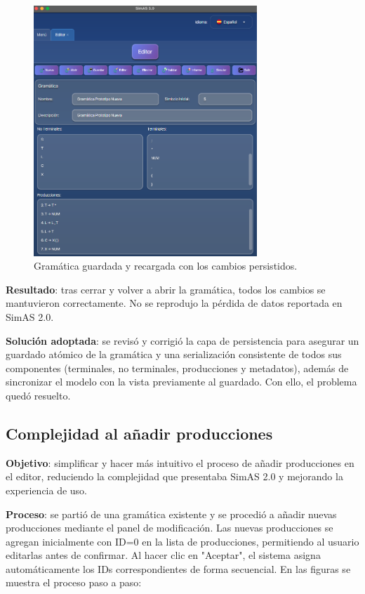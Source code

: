 \needspace{6cm}
\begin{figure}[H]
  \centering
  \includegraphics[width=0.75\textwidth]{figuras2/pruebas/editor/gramatica_nueva.png}
  \caption{Gramática guardada y recargada con los cambios persistidos.}
\end{figure}

\textbf{Resultado}: tras cerrar y volver a abrir la gramática, todos los cambios se mantuvieron correctamente. No se reprodujo la pérdida de datos reportada en SimAS 2.0.
\medskip

\textbf{Solución adoptada}: se revisó y corrigió la capa de persistencia para asegurar un guardado atómico de la gramática y una serialización consistente de todos sus componentes (terminales, no terminales, producciones y metadatos), además de sincronizar el modelo con la vista previamente al guardado. Con ello, el problema quedó resuelto.

\subsection{Complejidad al añadir producciones}

\textbf{Objetivo}: simplificar y hacer más intuitivo el proceso de añadir producciones en el editor, reduciendo la complejidad que presentaba SimAS 2.0 y mejorando la experiencia de uso.
\medskip

\textbf{Proceso}: se partió de una gramática existente y se procedió a añadir nuevas producciones mediante el panel de modificación. Las nuevas producciones se agregan inicialmente con ID=0 en la lista de producciones, permitiendo al usuario editarlas antes de confirmar. Al hacer clic en "Aceptar", el sistema asigna automáticamente los IDs correspondientes de forma secuencial. En las figuras se muestra el proceso paso a paso:
\medskip

